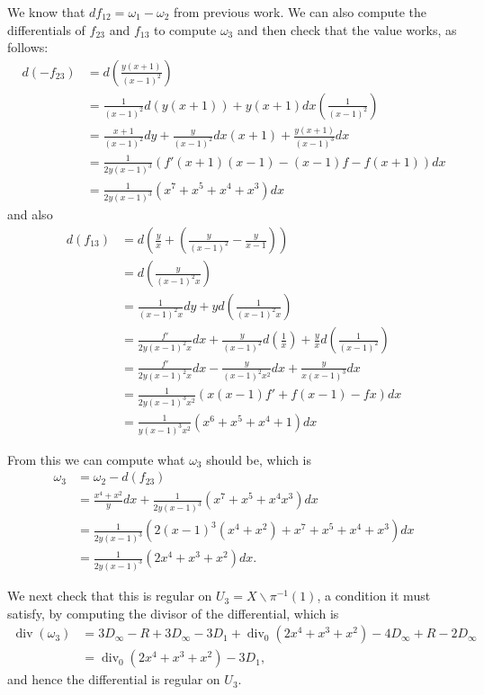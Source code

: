\documentclass[draft, 11pt]{article} %
\theoremstyle{plain}
\theoremstyle{remark}
\DeclareMathOperator{\di}{div}
\begin{document}
We know that $df_{12} =  \omega_1 - \omega_2$ from previous work.
We can also compute the differentials of $f_{23}$ and $f_{13}$ to compute $\omega_3$ and then check that the value works, as follows:
\begin{align}
d(-f_{23}) & = d \left( \frac{y(x+1)}{(x-1)^2} \right) \\
& = \frac{1}{(x-1)^2} d(y(x+1)) + y(x+1)dx\left( \frac{1}{(x-1)^2} \right) \\
& = \frac{x+1}{(x-1)^2}dy + \frac{y}{(x-1)^2}dx(x+1) + \frac{y(x+1)}{(x-1)^3}dx \\
& = \frac{1}{2y(x-1)^3} \left( f'(x+1)(x-1) - (x-1)f -f(x+1)\right)dx \\
& = \frac{1}{2y(x-1)^3} \left( x^7 + x^5 + x^4 + x^3 \right) dx
\end{align}
and also
\begin{align}
d(f_{13}) & = d \left( \frac{y}{x} + \left( \frac{y}{(x-1)^2} - \frac{y}{x-1} \right) \right)\\
& = d \left( \frac{y}{(x-1)^2x} \right) \\
& = \frac{1}{(x-1)^2x} dy + yd\left( \frac{1}{(x-1)^2x} \right) \\
& = \frac{f'}{2y(x-1)^2x}dx + \frac{y}{(x-1)^2}d \left( \frac{1}{x} \right) + \frac{y}{x} d\left( \frac{1}{(x-1)^2} \right) \\
& = \frac{f'}{2y(x-1)^2x}dx - \frac{y}{(x-1)^2x^2}dx + \frac{y}{x(x-1)^3} dx \\
& = \frac{1}{2y(x-1)^3x^2} \left( x(x-1)f' + f(x-1) -fx \right) dx \\
& = \frac{1}{y(x-1)^3x^2} \left( x^6 + x^5 + x^4 + 1\right) dx
\end{align}

From this we can compute what $\omega_3$ should be, which is
\begin{align}
\omega_3 & = \omega_2 - d\left(f_{23} \right) \\
& = \frac{x^4 + x^2}{y}dx + \frac{1}{2y(x-1)^3}\left( x^7 + x^5 + x^4 x^3\right) dx \\
& = \frac{1}{2y(x-1)^3} (2(x-1)^3(x^4+x^2) + x^7 + x^5 + x^4 + x^3) dx \\
& = \frac{1}{2y(x-1)^3}(2x^4+x^3+x^2)dx.
\end{align}

We next check that this is regular on $U_3 = X \backslash \pi^{-1}(1)$, a condition it must satisfy, by computing the divisor of the differential, which is
\begin{align}
\di( \omega_3 ) & = 3D_\infty -R+3D_\infty - 3D_1 + \di_0(2x^4+x^3+x^2) - 4D_\infty +R -2D_\infty \\
& = \di_0(2x^4 + x^3 +x^2) -3D_1,
\end{align}
and hence the differential is regular on $U_3$.
\end{document}
